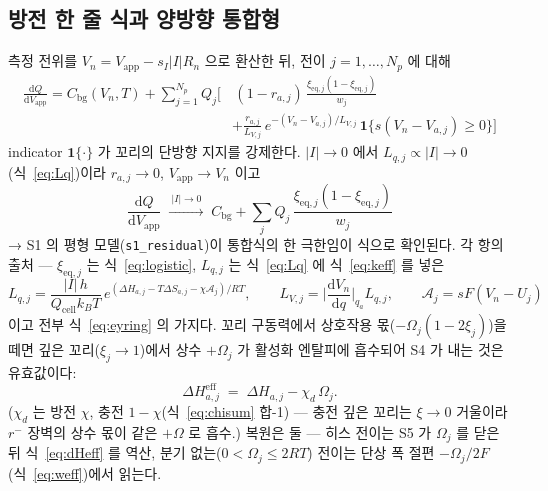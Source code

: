 \documentclass[11pt,a4paper]{article}
\newcommand{\dd}{\mathrm{d}}
\newcommand{\eff}{\mathrm{eff}}
\newcommand{\eq}{\mathrm{eq}}
\newcommand{\app}{\mathrm{app}}
\newcommand{\cell}{\mathrm{cell}}
\newcommand{\bg}{\mathrm{bg}}
\begin{document}
\subsection{방전 한 줄 식과 양방향 통합형}
측정 전위를 $V_n=V_\app-s_I|I|R_n$ 으로 환산한 뒤, 전이 $j=1,\dots,N_p$ 에 대해
\begin{equation}
\boxed{\;\begin{aligned}\frac{\dd Q}{\dd V_\app}=C_\bg(V_n,T)+\sum_{j=1}^{N_p}Q_j\bigg[&\,
(1-r_{a,j})\,\frac{\xi_{\eq,j}(1-\xi_{\eq,j})}{w_j}\\[-2pt]
&+\frac{r_{a,j}}{L_{V,j}}\,e^{-(V_n-V_{a,j})/L_{V,j}}\,\mathbf 1\{s(V_n-V_{a,j})\ge0\}\bigg]\end{aligned}\;}
\label{eq:master}
\end{equation}
indicator $\mathbf 1\{\cdot\}$ 가 꼬리의 단방향 지지를 강제한다. $|I|\to0$ 에서 $L_{q,j}\propto|I|\to0$(식~\eqref{eq:Lq})이라 $r_{a,j}\to0$, $V_\app\to V_n$ 이고
\begin{equation*}
\frac{\dd Q}{\dd V_\app}\;\xrightarrow{\ |I|\to0\ }\;
C_\bg+\sum_jQ_j\,\frac{\xi_{\eq,j}(1-\xi_{\eq,j})}{w_j}
\end{equation*}
→ S1 의 평형 모델(\texttt{s1\_residual})이 통합식의 한 극한임이 식으로 확인된다. 각 항의 출처 — $\xi_{\eq,j}$ 는 식~\eqref{eq:logistic}, $L_{q,j}$ 는 식~\eqref{eq:Lq} 에 식~\eqref{eq:keff} 를 넣은
\begin{equation*}
L_{q,j}=\frac{|I|\,h}{Q_\cell k_BT}\,
e^{(\Delta H_{a,j}-T\Delta S_{a,j}-\chi\mathcal A_j)/RT},
\qquad L_{V,j}=\Big|\frac{\dd V_n}{\dd q}\Big|_{q_a}L_{q,j},
\qquad \mathcal A_j=sF(V_n-U_j)
\end{equation*}
이고 전부 식~\eqref{eq:eyring} 의 가지다. 꼬리 구동력에서 상호작용 몫($-\Omega_j(1-2\xi_j)$)을 떼면 깊은 꼬리($\xi_j\to1$)에서 상수 $+\Omega_j$ 가 활성화 엔탈피에 흡수되어 S4 가 내는 것은 유효값이다:
\begin{equation}
\Delta H_{a,j}^{\eff}\;=\;\Delta H_{a,j}-\chi_d\,\Omega_j.
\label{eq:dHeff}
\end{equation}
($\chi_d$ 는 방전 $\chi$, 충전 $1-\chi$(식~\eqref{eq:chisum} 합-1) — 충전 깊은 꼬리는 $\xi\to0$ 거울이라 $r^-$ 장벽의 상수 몫이 같은 $+\Omega$ 로 흡수.) 복원은 둘 — 히스 전이는 S5 가 $\Omega_j$ 를 닫은 뒤 식~\eqref{eq:dHeff} 를 역산, 분기 없는($0<\Omega_j\le2RT$) 전이는 단상 폭 절편 $-\Omega_j/2F$(식~\eqref{eq:weff})에서 읽는다.
\end{document}
